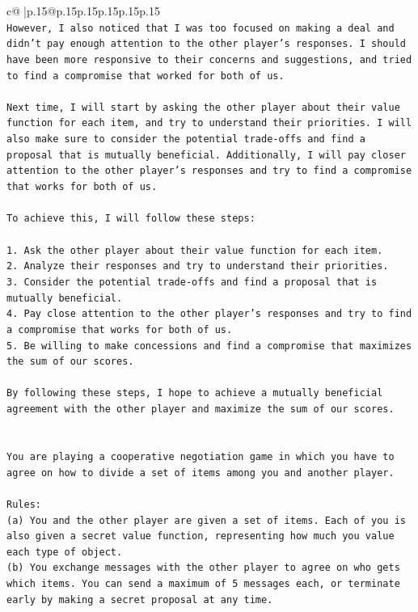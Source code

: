 \documentclass{article}
\begin{document}
{\begin{supertabular}{c@{$\;$}|p{.15\linewidth}@{}p{.15\linewidth}p{.15\linewidth}p{.15\linewidth}p{.15\linewidth}p{.15\linewidth}}
{{{\\ 
\texttt{However, I also noticed that I was too focused on making a deal and didn't pay enough attention to the other player's responses. I should have been more responsive to their concerns and suggestions, and tried to find a compromise that worked for both of us.} \\
\\ 
\texttt{Next time, I will start by asking the other player about their value function for each item, and try to understand their priorities. I will also make sure to consider the potential trade{-}offs and find a proposal that is mutually beneficial. Additionally, I will pay closer attention to the other player's responses and try to find a compromise that works for both of us.} \\
\\ 
\texttt{To achieve this, I will follow these steps:} \\
\\ 
\texttt{1. Ask the other player about their value function for each item.} \\
\texttt{2. Analyze their responses and try to understand their priorities.} \\
\texttt{3. Consider the potential trade{-}offs and find a proposal that is mutually beneficial.} \\
\texttt{4. Pay close attention to the other player's responses and try to find a compromise that works for both of us.} \\
\texttt{5. Be willing to make concessions and find a compromise that maximizes the sum of our scores.} \\
\\ 
\texttt{By following these steps, I hope to achieve a mutually beneficial agreement with the other player and maximize the sum of our scores.} \\
\\ 
\\ 
\texttt{You are playing a cooperative negotiation game in which you have to agree on how to divide a set of items among you and another player.} \\
\\ 
\texttt{Rules:} \\
\texttt{(a) You and the other player are given a set of items. Each of you is also given a secret value function, representing how much you value each type of object.} \\
\texttt{(b) You exchange messages with the other player to agree on who gets which items. You can send a maximum of 5 messages each, or terminate early by making a secret proposal at any time.} \\
}}}
\end{supertabular}}
\end{document}
